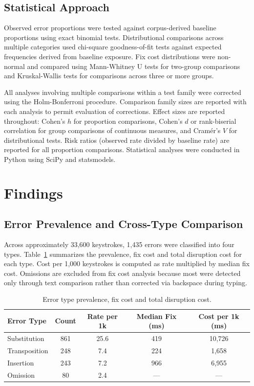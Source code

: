 \documentclass[12pt]{article}
\begin{document}
\subsection{Statistical Approach}

Observed error proportions were tested against corpus-derived baseline proportions using exact binomial tests. Distributional comparisons across multiple categories used chi-square goodness-of-fit tests against expected frequencies derived from baseline exposure. Fix cost distributions were non-normal and compared using Mann-Whitney U tests for two-group comparisons and Kruskal-Wallis tests for comparisons across three or more groups.

All analyses involving multiple comparisons within a test family were corrected using the Holm-Bonferroni procedure. Comparison family sizes are reported with each analysis to permit evaluation of corrections. Effect sizes are reported throughout: Cohen's $h$ for proportion comparisons, Cohen's $d$ or rank-biserial correlation for group comparisons of continuous measures, and Cram\'{e}r's $V$ for distributional tests. Risk ratios (observed rate divided by baseline rate) are reported for all proportion comparisons. Statistical analyses were conducted in Python using SciPy and statsmodels.

\section{Findings}

\subsection{Error Prevalence and Cross-Type Comparison}

Across approximately 33,600 keystrokes, 1,435 errors were classified into four types. Table~\ref{tab:error_prevalence} summarizes the prevalence, fix cost and total disruption cost for each type. Cost per 1,000 keystrokes is computed as rate multiplied by median fix cost. Omissions are excluded from fix cost analysis because most were detected only through text comparison rather than corrected via backspace during typing.

\begin{table}[htbp]
\centering
\caption{Error type prevalence, fix cost and total disruption cost.}
\label{tab:error_prevalence}
\begin{tabular}{lcccc}
\toprule
Error Type & Count & Rate per 1k & Median Fix (ms) & Cost per 1k (ms) \\
\midrule
Substitution & 861 & 25.6 & 419 & 10,726 \\
Transposition & 248 & 7.4 & 224 & 1,658 \\
Insertion & 243 & 7.2 & 966 & 6,955 \\
Omission & 80 & 2.4 & --- & --- \\
\bottomrule
\end{tabular}
\end{table}
\end{document}
